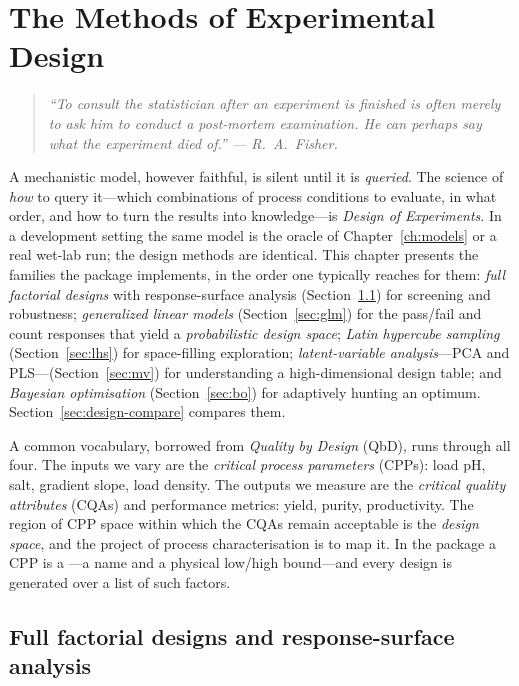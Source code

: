 \chapter{The Methods of Experimental Design}
\label{ch:design}

\begin{quote}\itshape
``To consult the statistician after an experiment is finished is often merely to
ask him to conduct a post-mortem examination. He can perhaps say what the
experiment died of.'' --- R.~A.~Fisher.
\end{quote}

\noindent
A mechanistic model, however faithful, is silent until it is \emph{queried}. The
science of \emph{how} to query it---which combinations of process conditions to
evaluate, in what order, and how to turn the results into knowledge---is
\emph{Design of Experiments}. In a development setting the same model is the
oracle of Chapter~\ref{ch:models} or a real wet-lab run; the design methods are
identical. This chapter presents the families the package implements, in the
order one typically reaches for them: \emph{full factorial designs} with
response-surface analysis (Section~\ref{sec:factorial}) for screening and
robustness; \emph{generalized linear models} (Section~\ref{sec:glm}) for the
pass/fail and count responses that yield a \emph{probabilistic design space};
\emph{Latin hypercube sampling} (Section~\ref{sec:lhs}) for space-filling
exploration; \emph{latent-variable analysis}---PCA and PLS---(Section~\ref{sec:mv})
for understanding a high-dimensional design table; and \emph{Bayesian
optimisation} (Section~\ref{sec:bo}) for adaptively hunting an optimum.
Section~\ref{sec:design-compare} compares them.

A common vocabulary, borrowed from \emph{Quality by Design} (QbD), runs through
all four. The inputs we vary are the \emph{critical process parameters} (CPPs):
load pH, salt, gradient slope, load density. The outputs we measure are the
\emph{critical quality attributes} (CQAs) and performance metrics: yield, purity,
productivity. The region of CPP space within which the CQAs remain acceptable is
the \emph{design space}, and the project of process characterisation is to map
it. In the package a CPP is a ---a name and a physical low/high
bound---and every design is generated over a list of such factors.

\section{Full factorial designs and response-surface analysis}
\label{sec:factorial}

